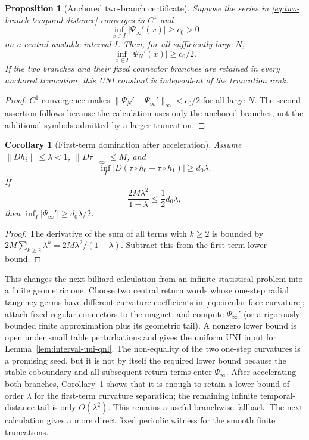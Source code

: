 \documentclass[11pt]{article}
\newtheorem{proposition}[theorem]{Proposition}
\newtheorem{corollary}[theorem]{Corollary}
\begin{document}
\begin{proposition}[Anchored two-branch certificate]
\label{prop:two-branch-uni}
Suppose the series in \eqref{eq:two-branch-temporal-distance} converges in
$C^1$ and
\[
 \inf_{x\in I}|\Psi_\infty'(x)|\ge c_0>0
\]
on a central unstable interval $I$.  Then, for all sufficiently large $N$,
\[
 \inf_{x\in I}|\Psi_N'(x)|\ge c_0/2.
\]
If the two branches and their fixed connector branches are retained in every
anchored truncation, this UNI constant is independent of the truncation rank.
\end{proposition}

\begin{proof}
$C^1$ convergence makes
$\|\Psi_N'-\Psi_\infty'\|_\infty<c_0/2$ for all large $N$.  The second
assertion follows because the calculation uses only the anchored branches,
not the additional symbols admitted by a larger truncation.
\end{proof}

\begin{corollary}[First-term domination after acceleration]
\label{cor:first-term-uni}
Assume $\|Dh_i\|\le\lambda<1$, $\|D\tau\|_\infty\le M$, and
\[
 \inf_I|D(\tau\circ h_0-\tau\circ h_1)|\ge d_0\lambda .
\]
If
\[
 \frac{2M\lambda^2}{1-\lambda}\le\frac12d_0\lambda,
\]
then $\inf_I|\Psi_\infty'|\ge d_0\lambda/2$.
\end{corollary}

\begin{proof}
The derivative of the sum of all terms with $k\ge2$ is bounded by
$2M\sum_{k\ge2}\lambda^k=2M\lambda^2/(1-\lambda)$.  Subtract this from the
first-term lower bound.
\end{proof}

This changes the next billiard calculation from an infinite statistical
problem into a finite geometric one.  Choose two central return words whose
one-step radial tangency germs have different curvature coefficients in
\eqref{eq:circular-face-curvature}; attach fixed regular connectors to the
magnet; and compute $\Psi_\infty'$ (or a rigorously bounded finite
approximation plus its geometric tail).  A nonzero lower bound is open under
small table perturbations and gives the uniform UNI input for
Lemma~\ref{lem:interval-uni-qnl}.  The non-equality of the two one-step
curvatures is a promising seed, but it is not by itself the required lower
bound because the stable coboundary and all subsequent return terms enter
$\Psi_\infty$.
After accelerating both branches, Corollary~\ref{cor:first-term-uni} shows
that it is enough to retain a lower bound of order $\lambda$ for the
first-term curvature separation; the remaining infinite temporal-distance
tail is only $O(\lambda^2)$.  This remains a useful branchwise fallback.  The
next calculation gives a more direct fixed periodic witness for the smooth
finite truncations.
\end{document}
